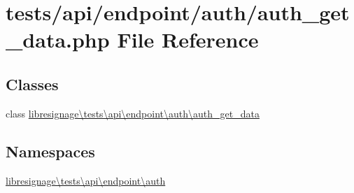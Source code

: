 \hypertarget{tests_2api_2endpoint_2auth_2auth__get__data_8php}{}\section{tests/api/endpoint/auth/auth\+\_\+get\+\_\+data.php File Reference}
\label{tests_2api_2endpoint_2auth_2auth__get__data_8php}
\subsection*{Classes}
\begin{DoxyCompactItemize}
\item 
class \hyperlink{classlibresignage_1_1tests_1_1api_1_1endpoint_1_1auth_1_1auth__get__data}{libresignage\textbackslash{}tests\textbackslash{}api\textbackslash{}endpoint\textbackslash{}auth\textbackslash{}auth\+\_\+get\+\_\+data}
\end{DoxyCompactItemize}
\subsection*{Namespaces}
\begin{DoxyCompactItemize}
\item 
 \hyperlink{namespacelibresignage_1_1tests_1_1api_1_1endpoint_1_1auth}{libresignage\textbackslash{}tests\textbackslash{}api\textbackslash{}endpoint\textbackslash{}auth}
\end{DoxyCompactItemize}
